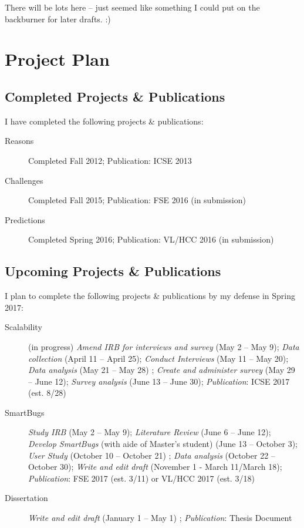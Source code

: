 \documentclass{llncs}
\begin{document}
There will be lots here -- just seemed like something I could put on the backburner for later drafts. :)

\section{Project Plan}

\subsection{Completed Projects \& Publications}

I have completed the following projects \& publications:
\begin{description}
	\item[Reasons] Completed Fall 2012; Publication: ICSE 2013
	\item[Challenges] Completed Fall 2015; Publication: FSE 2016 (in submission)
	\item[Predictions] Completed Spring 2016; Publication: VL/HCC 2016 (in submission)
\end{description}

\subsection{Upcoming Projects \& Publications}

I plan to complete the following projects \& publications by my defense in Spring 2017:

\begin{description}
	\item[Scalability] (in progress) \textit{Amend IRB for interviews and survey} (May 2 -- May 9); \textit{Data collection} (April 11 -- April 25); \textit{Conduct Interviews} (May 11 -- May 20); \textit{Data analysis} (May 21 -- May 28) ; \textit{Create and administer survey} (May 29 -- June 12); \textit{Survey analysis} (June 13 -- June 30); \textit{Publication}: ICSE 2017 (est. 8/28)
	\item[SmartBugs] \textit{Study IRB} (May 2 -- May 9); \textit{Literature Review} (June 6 -- June 12); \textit{Develop SmartBugs} (with aide of Master's student) (June 13 -- October 3); \textit{User Study} (October 10 -- October 21) ; \textit{Data analysis} (October 22 -- October 30); \textit{Write and edit draft} (November 1 - March 11/March 18); \textit{Publication}: FSE 2017 (est. 3/11) or VL/HCC 2017 (est. 3/18)
	\item[Dissertation] \textit{Write and edit draft} (January 1 -- May 1) ; \textit{Publication}: Thesis Document
\end{description}
\end{document}
